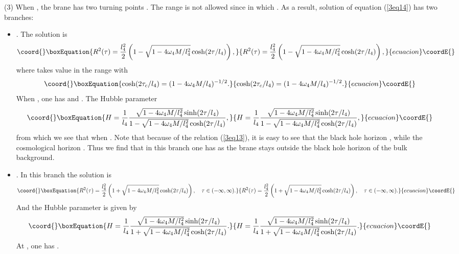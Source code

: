 \documentclass[a4paper,12pt]{article}
\begin{document}
    (3) When \coordHE{}, the brane has two turning 
 points \coordHE{}. The range \coordHE{} is not allowed  since in which 
\coordHE{}. As a result,  solution of 
  equation (\ref{3eq14}) has   two branches:
  \begin{itemize}
  \item \myHighlight{$x\in (0, x_-]$}\coordHE{}. The solution is
  \begin{equation}\coord{}\boxEquation{
  R^2(\tau)= \frac{l_4^2}{2}\left(1
  -\sqrt{1-4\omega_4M/l_4^2}\cosh(2\tau/l_4)\right),
  }{
  R^2(\tau)= \frac{l_4^2}{2}\left(1
  -\sqrt{1-4\omega_4M/l_4^2}\cosh(2\tau/l_4)\right),
  }{ecuacion}\coordE{}\end{equation}
  where \myHighlight{$\tau$}\coordHE{} takes value in the range \coordHE{} with
\begin{equation}\coord{}\boxEquation{
 \cosh(2\tau_c/l_4)=(1-4\omega_4M/l_4)^{-1/2}.
 }{
 \cosh(2\tau_c/l_4)=(1-4\omega_4M/l_4)^{-1/2}.
 }{ecuacion}\coordE{}\end{equation}
  When \coordHE{}, one has \coordHE{} and \coordHE{}.
  The Hubble parameter
  \begin{equation}\coord{}\boxEquation{
  H
  =\frac{1}{l_4}\frac{\sqrt{1-4\omega_4 M/l_4^2}\sinh(2\tau/l_4)}
    {1-\sqrt{1-4\omega_4M/l_4^2}\cosh(2\tau/l_4)},
    }{
  H
  =\frac{1}{l_4}\frac{\sqrt{1-4\omega_4 M/l_4^2}\sinh(2\tau/l_4)}
    {1-\sqrt{1-4\omega_4M/l_4^2}\cosh(2\tau/l_4)},
    }{ecuacion}\coordE{}\end{equation}
    from which we see that \coordHE{} when \coordHE{}.
Note that because of the relation (\ref{3eq13}),
it is easy to see that the black hole horizon \coordHE{}, while the cosmological horizon 
\coordHE{}.
 Thus we find that in this branch one has \coordHE{} as
 the brane stays outside the black hole horizon  of the bulk
 background.

  \item \myHighlight{$x\in[x_+,\infty)$}\coordHE{}. In this branch the solution is
  \begin{equation}\coord{}\boxEquation{
  R^2(\tau)=\frac{l^2_4}{2}\left( 1+\sqrt{1-4\omega_4
  M/l_4^2}\cosh(2\tau/l_4)\right), \ \ \ \tau \in (-\infty,
  \infty).
  }{
  R^2(\tau)=\frac{l^2_4}{2}\left( 1+\sqrt{1-4\omega_4
  M/l_4^2}\cosh(2\tau/l_4)\right), \ \ \ \tau \in (-\infty,
  \infty).
  }{ecuacion}\coordE{}\end{equation}
  And the Hubble parameter is given by
  \begin{equation}\coord{}\boxEquation{
  H =\frac{1}{l_4}\frac{\sqrt{1-4\omega_4 M/l_4^2}\sinh(2\tau/l_4)}
    {1+\sqrt{1-4\omega_4M/l_4^2}\cosh(2\tau/l_4)}.
    }{
  H =\frac{1}{l_4}\frac{\sqrt{1-4\omega_4 M/l_4^2}\sinh(2\tau/l_4)}
    {1+\sqrt{1-4\omega_4M/l_4^2}\cosh(2\tau/l_4)}.
    }{ecuacion}\coordE{}\end{equation}
  At \coordHE{}, one has \coordHE{}.
\end{itemize}
\end{document}
